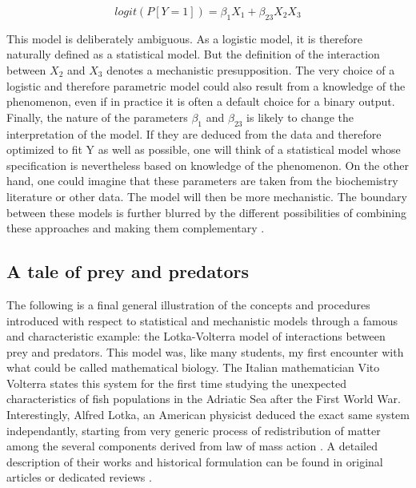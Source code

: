 \documentclass[a4paper,12pt,twoside,onecolumn,openright,final,oldfontcommands]{memoir}
\begin{document}
\[logit(P[Y=1])=\beta_1X_1 + \beta_{23}X_2X_3\]

This model is deliberately ambiguous. As a logistic model, it is
therefore naturally defined as a statistical model. But the definition
of the interaction between \(X_2\) and \(X_3\) denotes a mechanistic
presupposition. The very choice of a logistic and therefore parametric
model could also result from a knowledge of the phenomenon, even if in
practice it is often a default choice for a binary output. Finally, the
nature of the parameters \(\beta_{1}\) and \(\beta_{23}\) is likely to
change the interpretation of the model. If they are deduced from the
data and therefore optimized to fit Y as well as possible, one will
think of a statistical model whose specification is nevertheless based
on knowledge of the phenomenon. On the other hand, one could imagine
that these parameters are taken from the biochemistry literature or
other data. The model will then be more mechanistic. The boundary
between these models is further blurred by the different possibilities
of combining these approaches and making them complementary
\citep{baker2018mechanistic, salvucci2019machine}.

\subsection{A tale of prey and predators}\label{lotkasection}

The following is a final general illustration of the concepts and
procedures introduced with respect to statistical and mechanistic models
through a famous and characteristic example: the Lotka-Volterra model of
interactions between prey and predators. This model was, like many
students, my first encounter with what could be called mathematical
biology. The Italian mathematician Vito Volterra states this system for
the first time studying the unexpected characteristics of fish
populations in the Adriatic Sea after the First World War.
Interestingly, Alfred Lotka, an American physicist deduced the exact
same system independantly, starting from very generic process of
redistribution of matter among the several components derived from law
of mass action \citep{knuuttila2017modelling}. A detailed description of
their works and historical formulation can be found in original articles
\citep{lotka1925principles, volterra1926fluctuations} or dedicated
reviews \citep{knuuttila2017modelling}.
\end{document}
